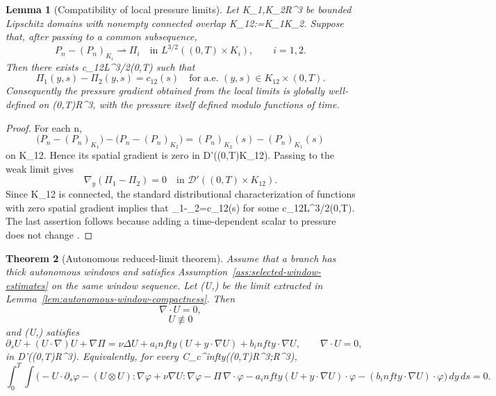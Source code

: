 \documentclass[11pt]{amsart}
\def\({}%
\def\){}%
\def\mathbb#1{#1}%
\def\infty{infty}%
\theoremstyle{plain}
\newtheorem{theorem}{Theorem}[section]
\newtheorem{lemma}[theorem]{Lemma}
\theoremstyle{definition}
\theoremstyle{remark}
\begin{document}
\begin{lemma}[Compatibility of local pressure limits]\label{lem:pressure-compatibility}
Let \(K_1,K_2\Subset\mathbb R^3\) be bounded Lipschitz domains with
nonempty connected overlap \(K_{12}:=K_1\cap K_2\).  Suppose that, after passing to a common
subsequence,
\[
  P_n-(P_n)_{K_i}\rightharpoonup \Pi_i
  \quad\text{in }L^{3/2}((0,T)\times K_i),
  \qquad i=1,2.
\]
Then there exists \(c_{12}\in L^{3/2}(0,T)\) such that
\[
  \Pi_1(y,s)-\Pi_2(y,s)=c_{12}(s)
  \quad\text{for a.e. }(y,s)\in K_{12}\times(0,T).
\]
Consequently the pressure gradient \(\nabla\Pi\) obtained from the local limits is globally
well-defined on \((0,T)\times\mathbb R^3\), with the pressure itself defined modulo functions
of time.
\end{lemma}

\begin{proof}
For each \(n\),
\[
  \bigl(P_n-(P_n)_{K_1}\bigr)-\bigl(P_n-(P_n)_{K_2}\bigr)
  =(P_n)_{K_2}(s)-(P_n)_{K_1}(s)
\]
on \(K_{12}\).  Hence its spatial gradient is zero in
\(\mathcal D'((0,T)\times K_{12})\).  Passing to the weak limit gives
\[
  \nabla_y(\Pi_1-\Pi_2)=0
  \quad\text{in }\mathcal D'((0,T)\times K_{12}).
\]
Since \(K_{12}\) is connected, the standard distributional characterization of functions with
zero spatial gradient implies that \(\Pi_1-\Pi_2=c_{12}(s)\) for some
\(c_{12}\in L^{3/2}(0,T)\).  The last assertion follows because adding a time-dependent scalar
to pressure does not change \(\nabla\Pi\).
\end{proof}

\begin{theorem}[Autonomous reduced-limit theorem]\label{thm:autonomous-limit}
Assume that a branch has thick autonomous windows and satisfies
Assumption~\ref{ass:selected-window-estimates} on the same window sequence.  Let
\((U,\Pi)\) be the limit extracted in Lemma~\ref{lem:autonomous-window-compactness}.  Then
\[
  \nabla\cdot U=0,
\]
\[
  U\not\equiv0
\]
and \((U,\Pi)\) satisfies
\begin{equation}\label{eq:autonomous-limit}
  \partial_sU+(U\cdot\nabla)U+\nabla\Pi
  =\nu\Delta U+a_\infty(U+y\cdot\nabla U)+b_\infty\cdot\nabla U,
  \qquad
  \nabla\cdot U=0,
\end{equation}
in \(\mathcal D'((0,T)\times\mathbb R^3)\).  Equivalently, for every
\(\varphi\in C_c^\infty((0,T)\times\mathbb R^3;\mathbb R^3)\),
\[
  \int_0^T\!\int
  \bigl(
  -U\cdot\partial_s\varphi
  -(U\otimes U):\nabla\varphi
  +\nu\nabla U:\nabla\varphi
  -\Pi\,\nabla\cdot\varphi
  -a_\infty(U+y\cdot\nabla U)\cdot\varphi
  -(b_\infty\cdot\nabla U)\cdot\varphi
  \bigr)\,dy\,ds=0.
\]
\end{theorem}
\end{document}
